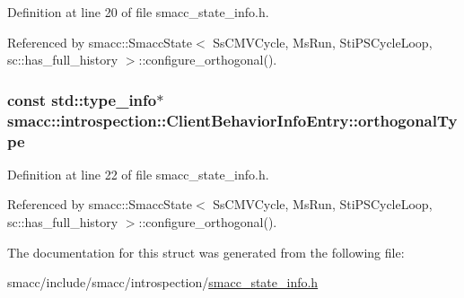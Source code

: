 Definition at line 20 of file smacc\+\_\+state\+\_\+info.\+h.



Referenced by smacc\+::\+Smacc\+State$<$ Ss\+C\+M\+V\+Cycle, Ms\+Run, Sti\+P\+S\+Cycle\+Loop, sc\+::has\+\_\+full\+\_\+history $>$\+::configure\+\_\+orthogonal().

\subsubsection[{\texorpdfstring{orthogonal\+Type}{orthogonalType}}]{\setlength{\rightskip}{0pt plus 5cm}const std\+::type\+\_\+info$\ast$ smacc\+::introspection\+::\+Client\+Behavior\+Info\+Entry\+::orthogonal\+Type}\hypertarget{structsmacc_1_1introspection_1_1ClientBehaviorInfoEntry_aabffb57e6ee723ce1b2bdb6ad30c6993}{}\label{structsmacc_1_1introspection_1_1ClientBehaviorInfoEntry_aabffb57e6ee723ce1b2bdb6ad30c6993}


Definition at line 22 of file smacc\+\_\+state\+\_\+info.\+h.



Referenced by smacc\+::\+Smacc\+State$<$ Ss\+C\+M\+V\+Cycle, Ms\+Run, Sti\+P\+S\+Cycle\+Loop, sc\+::has\+\_\+full\+\_\+history $>$\+::configure\+\_\+orthogonal().



The documentation for this struct was generated from the following file\+:\begin{DoxyCompactItemize}
\item 
smacc/include/smacc/introspection/\hyperlink{smacc__state__info_8h}{smacc\+\_\+state\+\_\+info.\+h}\end{DoxyCompactItemize}
